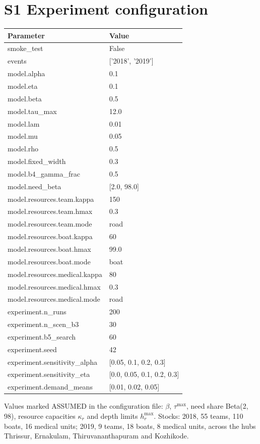\documentclass[10pt]{article}
\begin{document}
\section*{S1 Experiment configuration}
\begin{longtable}{ll}\toprule Parameter & Value\\\midrule
smoke\_test & False\\
events & ['2018', '2019']\\
model.alpha & 0.1\\
model.eta & 0.1\\
model.beta & 0.5\\
model.tau\_max & 12.0\\
model.lam & 0.01\\
model.mu & 0.05\\
model.rho & 0.5\\
model.fixed\_width & 0.3\\
model.b4\_gamma\_frac & 0.5\\
model.need\_beta & [2.0, 98.0]\\
model.resources.team.kappa & 150\\
model.resources.team.hmax & 0.3\\
model.resources.team.mode & road\\
model.resources.boat.kappa & 60\\
model.resources.boat.hmax & 99.0\\
model.resources.boat.mode & boat\\
model.resources.medical.kappa & 80\\
model.resources.medical.hmax & 0.3\\
model.resources.medical.mode & road\\
experiment.n\_runs & 200\\
experiment.n\_scen\_b3 & 30\\
experiment.b5\_search & 60\\
experiment.seed & 42\\
experiment.sensitivity\_alpha & [0.05, 0.1, 0.2, 0.3]\\
experiment.sensitivity\_eta & [0.0, 0.05, 0.1, 0.2, 0.3]\\
experiment.demand\_means & [0.01, 0.02, 0.05]\\
\bottomrule\end{longtable}
\noindent Values marked ASSUMED in the configuration file: $\beta$, $\tau^{\max}$, need share Beta(2, 98), resource capacities $\kappa_r$ and depth limits $h^{\max}_r$. Stocks: 2018, 55 teams, 110 boats, 16 medical units; 2019, 9 teams, 18 boats, 8 medical units, across the hubs Thrissur, Ernakulam, Thiruvananthapuram and Kozhikode.
\end{document}
